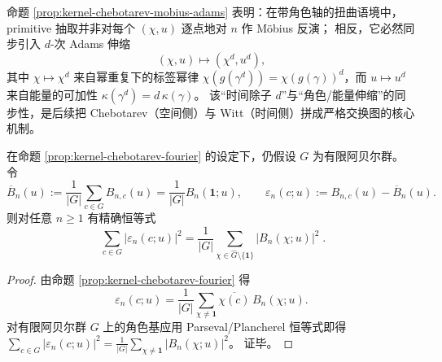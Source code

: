 \begin{remark}\label{rem:kernel-chebotarev-mobius-adams-meaning}
命题 \ref{prop:kernel-chebotarev-mobius-adams} 表明：在带角色轴的扭曲语境中，primitive 抽取并非对每个 \((\chi,u)\) 逐点地对 \(n\) 作 Möbius 反演；
相反，它必然同步引入 \(d\)-次 Adams 伸缩
\[
(\chi,u)\longmapsto(\chi^d,u^d),
\]
其中 \(\chi\mapsto\chi^d\) 来自幂重复下的标签幂律 \(\chi(g(\gamma^d))=\chi(g(\gamma))^d\)，而 \(u\mapsto u^d\) 来自能量的可加性 \(\kappa(\gamma^d)=d\,\kappa(\gamma)\)。
该“时间除子 \(d\)”与“角色/能量伸缩”的同步性，是后续把 Chebotarev（空间侧）与 Witt（时间侧）拼成严格交换图的核心机制。
\end{remark}

\begin{corollary}[Chebotarev--Plancherel 能量恒等式：空间侧均方偏差 \texorpdfstring{$=$}{=} 角色侧能量和]\label{cor:kernel-chebotarev-plancherel-energy}
在命题 \ref{prop:kernel-chebotarev-fourier} 的设定下，仍假设 \(G\) 为有限阿贝尔群。
令
\[
\overline{B}_n(u):=\frac{1}{|G|}\sum_{c\in G}B_{n,c}(u)=\frac{1}{|G|}B_n(\mathbf{1};u),
\qquad
\varepsilon_n(c;u):=B_{n,c}(u)-\overline{B}_n(u).
\]
则对任意 \(n\ge 1\) 有精确恒等式
\[
\boxed{\;
\sum_{c\in G}\bigl|\varepsilon_n(c;u)\bigr|^2
=\frac{1}{|G|}\sum_{\chi\in\widehat G\setminus\{\mathbf{1}\}}\bigl|B_n(\chi;u)\bigr|^2\; }.
\]
\end{corollary}
\begin{proof}
由命题 \ref{prop:kernel-chebotarev-fourier} 得
\[
\varepsilon_n(c;u)
=\frac{1}{|G|}\sum_{\chi\ne \mathbf{1}}\overline{\chi(c)}\,B_n(\chi;u).
\]
对有限阿贝尔群 \(G\) 上的角色基应用 Parseval/Plancherel 恒等式即得
\(
\sum_{c\in G}|\varepsilon_n(c;u)|^2=\frac{1}{|G|}\sum_{\chi\ne\mathbf{1}}|B_n(\chi;u)|^2
\)。
证毕。
\end{proof}

